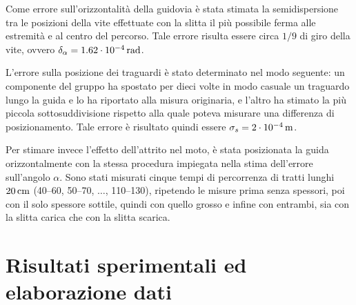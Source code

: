 \documentclass[italian,a4paper]{article}
\begin{document}
Come errore sull'orizzontalità della guidovia è stata stimata la semidispersione tra le posizioni della vite effettuate con la slitta il più possibile ferma alle estremità e al centro del percorso. Tale errore risulta essere circa $1/9$ di giro della vite, ovvero $\delta_{\alpha} = \unit[1.62 \cdot 10^{-4}]{rad}$.

L'errore sulla posizione dei traguardi è stato determinato nel modo seguente: un componente del gruppo ha spostato per dieci volte in modo casuale un traguardo lungo la guida e lo ha riportato alla misura originaria, e l'altro ha stimato la più piccola sottosuddivisione rispetto alla quale poteva misurare una differenza di posizionamento. Tale errore è risultato quindi essere $\sigma_{s} = \unit[2\cdot 10^{-4}]{m}$.

Per stimare invece l'effetto dell'attrito nel moto, è stata posizionata la guida orizzontalmente con la stessa procedura impiegata nella stima dell'errore sull'angolo $\alpha$. Sono stati misurati cinque tempi di percorrenza di tratti lunghi $\unit[20]{cm}$ (40--60, 50--70, $\dots$, 110--130), ripetendo le misure prima senza spessori, poi con il solo spessore sottile, quindi con quello grosso e infine con entrambi, sia con la slitta carica che con la slitta scarica.
\section{Risultati sperimentali ed elaborazione dati}
\end{document}
